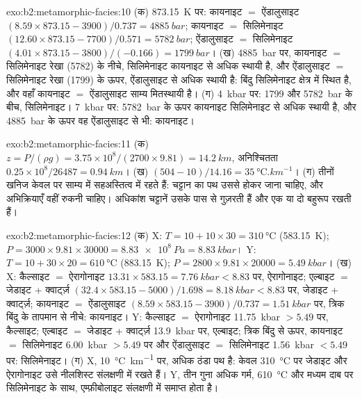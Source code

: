 \begin{solution}{exo:b2:metamorphic-facies:10}
(क) \qty{873.15}{K} पर: कायनाइट $=$ ऐंडालुसाइट $(8.59\times873.15 - 3900)/0.737 =
\qty{4885}{bar}$; कायनाइट $=$ सिलिमेनाइट $(12.60\times873.15 - 7700)/0.571 =
\qty{5782}{bar}$; ऐंडालुसाइट $=$ सिलिमेनाइट $(4.01\times873.15 - 3800)/(-0.166) =
\qty{1799}{bar}$। (ख) \qty{4885}{bar} पर, कायनाइट $=$ सिलिमेनाइट रेखा (5782) के नीचे,
सिलिमेनाइट कायनाइट से अधिक स्थायी है, और ऐंडालुसाइट $=$ सिलिमेनाइट रेखा
(1799) के ऊपर, ऐंडालुसाइट से अधिक स्थायी है: बिंदु सिलिमेनाइट क्षेत्र में स्थित है, और वहाँ
कायनाइट $=$ ऐंडालुसाइट साम्य मितस्थायी है। (ग) \qty{4}{kbar} पर: 1799
और \qty{5782}{bar} के बीच, सिलिमेनाइट। \qty{7}{kbar} पर: \qty{5782}{bar} के ऊपर कायनाइट
सिलिमेनाइट से अधिक स्थायी है, और \qty{4885}{bar} के ऊपर वह ऐंडालुसाइट से भी: कायनाइट।
\end{solution}

\begin{solution}{exo:b2:metamorphic-facies:11}
(क) $z = P/(\rho g) = 3.75\times10^8/(2700\times9.81) = \qty{14.2}{km}$, अनिश्चितता
$0.25\times10^8/26487 = \qty{0.94}{km}$। (ख) $(504 - 10)/14.16 =
\qty{35}{\celsius.km^{-1}}$। (ग) तीनों खनिज केवल  पर साम्य में
सहअस्तित्व में रहते हैं: चट्टान का पथ उससे होकर जाना चाहिए, और अभिक्रियाएँ
वहीं रुकनी चाहिए। अधिकांश चट्टानें उसके पास से गुज़रती हैं और एक या दो बहुरूप रखती हैं।
\end{solution}

\begin{solution}{exo:b2:metamorphic-facies:12}
(क) X: $T = 10 + 10\times30 = \qty{310}{\celsius}$ (\qty{583.15}{K}); $P = 3000\times
9.81\times30000 = \qty{8.83e8}{Pa} = \qty{8.83}{kbar}$। Y: $T = 10 + 30\times20 =
\qty{610}{\celsius}$ (\qty{883.15}{K}); $P = 2800\times9.81\times20000 = \qty{5.49}{kbar}$।
(ख) X: कैल्साइट $=$ ऐरागोनाइट $13.31\times583.15 = \qty{7.76}{kbar} < 8.83$ पर, ऐरागोनाइट;
एल्बाइट $=$ जेडाइट + क्वार्ट्ज़ $(32.4\times583.15 - 5000)/1.698 = \qty{8.18}{kbar} <
8.83$ पर, जेडाइट + क्वार्ट्ज़; कायनाइट $=$ ऐंडालुसाइट $(8.59\times583.15 - 3900)/0.737 =
\qty{1.51}{kbar}$ पर, त्रिक बिंदु के तापमान से नीचे: कायनाइट। Y: कैल्साइट $=$
ऐरागोनाइट \qty{11.75}{kbar} $> 5.49$ पर, कैल्साइट; एल्बाइट $=$ जेडाइट + क्वार्ट्ज़
\qty{13.9}{kbar} पर, एल्बाइट; त्रिक बिंदु से ऊपर, कायनाइट $=$ सिलिमेनाइट
\qty{6.00}{kbar} $> 5.49$ पर और ऐंडालुसाइट $=$ सिलिमेनाइट \qty{1.56}{kbar} $< 5.49$ पर:
सिलिमेनाइट। (ग) X, \qty{10}{\celsius\per\km} पर, अधिक ठंडा पथ है: केवल
\qty{310}{\celsius} पर जेडाइट और ऐरागोनाइट उसे नीलशिस्ट संलक्षणी में रखते हैं। Y, तीन गुना
अधिक गर्म, \qty{610}{\celsius} और मध्यम दाब पर सिलिमेनाइट के साथ, 
एम्फ़ीबोलाइट संलक्षणी में समाप्त होता है।
\end{solution}


